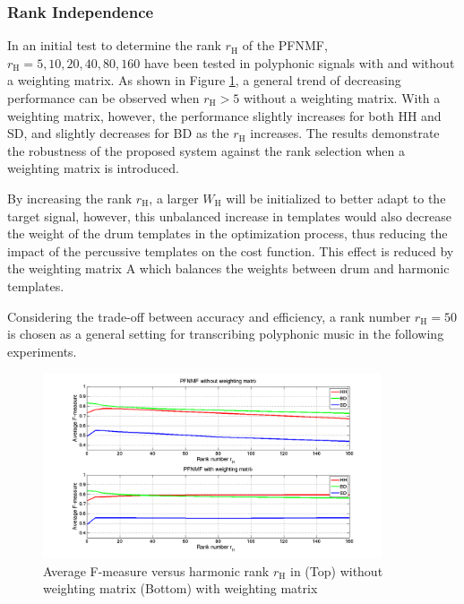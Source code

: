 \documentclass{article}
\begin{document}
\subsubsection{Rank Independence}\label{rank}
In an initial test to determine the rank $r_\mathrm{H}$ of the PFNMF, $r_\mathrm{H} = {5, 10, 20, 40, 80, 160}$ have been tested in polyphonic signals with and without a weighting matrix. As shown in Figure \ref{fig:rankTest}, a general trend of decreasing performance can be observed when $r_\mathrm{H} > 5$ without a weighting matrix. With a weighting matrix, however, the performance slightly increases for both HH and SD, and slightly decreases for BD as the $r_\mathrm{H}$ increases. The results demonstrate the robustness of the proposed system against the rank selection when a weighting matrix is introduced.

By increasing the rank $r_\mathrm{H}$, a larger $W_\mathrm{H}$ will be initialized to better adapt to the target signal, however, this unbalanced increase in templates would also decrease the weight of the drum templates in the optimization process, thus reducing the impact of the percussive templates on the cost function. This effect is reduced by the weighting matrix $\mathrm{A}$ which balances the weights between drum and harmonic templates. 

Considering the trade-off between accuracy and efficiency, a rank number $r_\mathrm{H} = 50$ is chosen as a general setting for transcribing polyphonic music in the following experiments.

\begin{figure}
 \centerline{
 \includegraphics[width=10cm]{rankTest_2.png}}
 \caption{Average F-measure versus harmonic rank $r_\mathrm{H}$ in (Top) without weighting matrix (Bottom) with weighting matrix}
 \label{fig:rankTest}
\end{figure}
\end{document}
